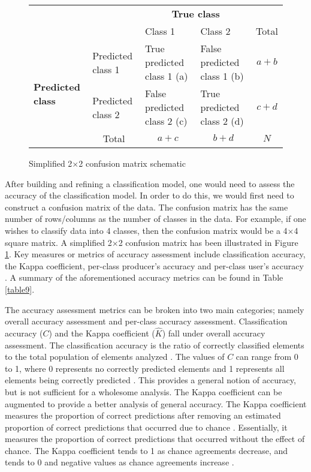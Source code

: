 {
	\renewcommand\extrarowheight{5pt}
\begin{figure}[H]
	\hskip-5pt
\begin{tabular}{l|p{3.4cm}|p{3.7cm}|p{3.7cm}|c}
	\multicolumn{2}{c}{}&\multicolumn{2}{c}{\bfseries True class \rm \vspace{4pt}}&\\
	\cline{3-4}
	\multicolumn{2}{c|}{}&Class 1& Class 2&\multicolumn{1}{c}{Total}\\
	\cline{2-4}
	\multirow{3}{*}{\parbox{2cm}{\centering \bfseries Predicted class \rm}}& Predicted class 1 & True predicted class 1 (a) & False predicted class 1 (b) & $a+b$\\
	\cline{2-4}
	& Predicted class 2 & False predicted class 2 (c) & True predicted class 2 (d) & $c+d$\\
	\cline{2-4}
	\multicolumn{1}{c}{} & \multicolumn{1}{c}{Total} & \multicolumn{1}{c}{$a+c$} & \multicolumn{    1}{c}{$b+d$} & \multicolumn{1}{c}{$N$}\\
\end{tabular}
\vspace{5pt}
\caption{Simplified 2$\times$2 confusion matrix schematic}
\label{fig9}
\end{figure}
}

\justify
After building and refining a classification model, one would need to assess the accuracy of the classification model. In order to do this, we would first need to construct a confusion matrix of the data. The confusion matrix has the same number of rows/columns as the number of classes in the data. For example, if one wishes to classify data into 4 classes, then the confusion matrix would be a 4$\times$4 square matrix. A simplified 2$\times$2 confusion matrix has been illustrated in Figure \ref{fig9}. Key measures or metrics of accuracy assessment include classification accuracy, the Kappa coefficient, per-class producer's accuracy and per-class user's accuracy \citep{banko1998}. A summary of the aforementioned accuracy metrics can be found in Table \ref{table9}.

\justify
The accuracy assessment metrics can be broken into two main categories; namely overall accuracy assessment and per-class accuracy assessment. Classification accuracy ($C$) and the Kappa coefficient ($\hat{K}$) fall under overall accuracy assessment. The classification accuracy is the ratio of correctly classified elements to the total population of elements analyzed \citep{banko1998}. The values of $C$ can range from 0 to 1, where 0 represents no correctly predicted elements and 1 represents all elements being correctly predicted \citep{banko1998}. This provides a general notion of accuracy, but is not sufficient for a wholesome analysis. The Kappa coefficient can be augmented to provide a better analysis of general accuracy. The Kappa coefficient measures the proportion of correct predictions after removing an estimated proportion of correct predictions that occurred due to chance \citep{banko1998}. Essentially, it measures the proportion of correct predictions that occurred without the effect of chance. The Kappa coefficient tends to 1 as chance agreements decrease, and tends to 0 and negative values as chance agreements increase \citep{banko1998}. 

